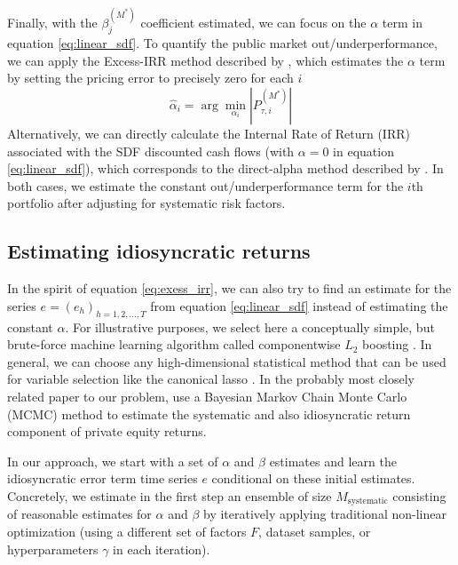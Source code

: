 \documentclass[12pt]{article}
\begin{document}
Finally, with the $\beta_j^{(M^*)}$ coefficient estimated, we can focus on the $\alpha$ term in equation \ref{eq:linear_sdf}.
To quantify the public market out/underperformance, we can apply the Excess-IRR method described by \cite{PG09}, which estimates the $\alpha$ term by setting the pricing error to precisely zero for each $i$
\begin{equation}
	\label{eq:exess_irr}
\hat{\alpha}_i = \arg \min_{\alpha_i} \left| P_{\tau, i}^{(M^*)}  \right|
\end{equation}
Alternatively, we can directly calculate the Internal Rate of Return (IRR) associated with the SDF discounted cash flows (with $\alpha=0$ in equation \ref{eq:linear_sdf}), which corresponds to the direct-alpha method described by \cite{GGS23}.
In both cases, we estimate the constant out/underperformance term for the $i$th portfolio after adjusting for systematic risk factors.

\subsection{Estimating idiosyncratic returns}
\label{sec:error_term_estimation}

In the spirit of equation \ref{eq:exess_irr}, we can also try to find an estimate for the series $e=(e_h)_{h=1,2,\dots,T}$ from equation \ref{eq:linear_sdf} instead of estimating the constant $\alpha$.
For illustrative purposes, we select here a conceptually simple, but brute-force machine learning algorithm called componentwise $L_2$ boosting \citep{B06}.
In general, we can choose any high-dimensional statistical method that can be used for variable selection like the canonical lasso \citep{BG11}.
In the probably most closely related paper to our problem, \cite{ACGP18} use a Bayesian Markov Chain Monte Carlo (MCMC) method to estimate the systematic and also idiosyncratic return component of private equity returns.

In our approach, we start with a set of $\alpha$ and $\beta$ estimates and learn the idiosyncratic error term time series $e$ conditional on these initial estimates.
Concretely, we estimate in the first step an ensemble of size $M_{\mathrm{systematic}}$ consisting of reasonable estimates for $\alpha$ and $\beta$ by iteratively applying traditional non-linear optimization (using a different set of factors $F$, dataset samples, or hyperparameters $\gamma$ in each iteration).
\end{document}
